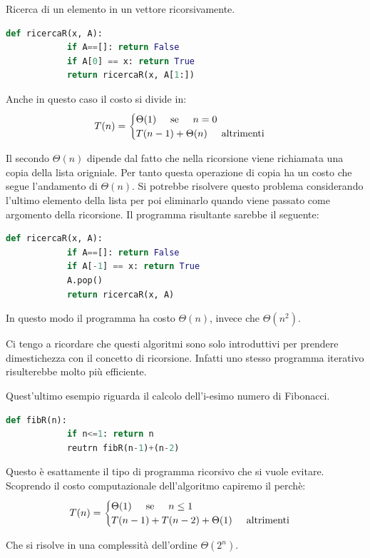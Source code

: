 \begin{example}
    Ricerca di un elemento in un vettore ricorsivamente.
    \begin{lstlisting}[language=Python]
        def ricercaR(x, A):
            if A==[]: return False
            if A[0] == x: return True
            return ricercaR(x, A[1:])
    \end{lstlisting}
    
    Anche in questo caso il costo si divide in:
    $$T(n)=\begin{cases}
        \Theta(1)\hspace{0.5cm}\text{se}\hspace{0.5cm}n=0\\
        T(n-1)+\Theta(n)\hspace{0.5cm}\text{altrimenti}
    \end{cases}$$
    
    Il secondo $\Theta(n)$ dipende dal fatto che nella ricorsione viene richiamata una copia della lista origniale. Per tanto questa operazione di copia ha un costo che segue l'andamento di $\Theta(n)$. Si potrebbe risolvere questo problema considerando l'ultimo elemento della lista per poi eliminarlo quando viene passato come argomento della ricorsione. Il programma risultante sarebbe il seguente:
    \begin{lstlisting}[language=Python]
        def ricercaR(x, A):
            if A==[]: return False
            if A[-1] == x: return True
            A.pop()
            return ricercaR(x, A)
    \end{lstlisting}
    In questo modo il programma ha costo $\Theta(n)$, invece che $\Theta(n^2)$.
\end{example}

Ci tengo a ricordare che questi algoritmi sono solo introduttivi per prendere dimestichezza con il concetto di ricorsione. Infatti uno stesso programma iterativo risulterebbe molto più efficiente.

\begin{example}
    Quest'ultimo esempio riguarda il calcolo dell'i-esimo numero di Fibonacci.
    \begin{lstlisting}[language=Python]
        def fibR(n):
            if n<=1: return n
            reutrn fibR(n-1)+(n-2)
    \end{lstlisting}
    
    Questo è esattamente il tipo di programma ricorsivo che si vuole evitare. Scoprendo il costo computazionale dell'algoritmo capiremo il perchè:
    $$T(n)=\begin{cases}
        \Theta(1)\hspace{0.5cm}\text{se}\hspace{0.5cm}n\leq1\\
        T(n-1)+T(n-2)+\Theta(1)\hspace{0.5cm}\text{altrimenti}
    \end{cases}$$
    
    Che si risolve in una complessità dell'ordine $\Theta(2^n)$.
\end{example}

